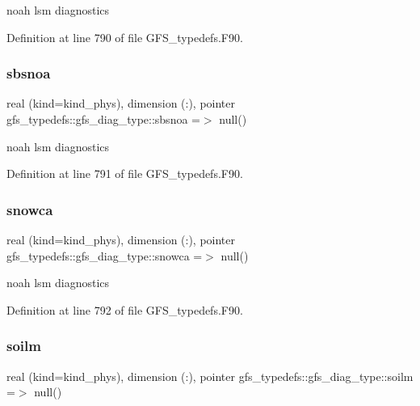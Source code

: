 noah lsm diagnostics 



Definition at line 790 of file G\+F\+S\+\_\+typedefs.\+F90.

\mbox{\label{structgfs__typedefs_1_1gfs__diag__type_acd355bef84752426ef998b18740d1b74}} 
\subsubsection{sbsnoa}
{\footnotesize\ttfamily real (kind=kind\+\_\+phys), dimension (\+:), pointer gfs\+\_\+typedefs\+::gfs\+\_\+diag\+\_\+type\+::sbsnoa =$>$ null()}



noah lsm diagnostics 



Definition at line 791 of file G\+F\+S\+\_\+typedefs.\+F90.

\mbox{\label{structgfs__typedefs_1_1gfs__diag__type_a33f2b7d46ef0551fcfcb0f12c974879d}} 
\subsubsection{snowca}
{\footnotesize\ttfamily real (kind=kind\+\_\+phys), dimension (\+:), pointer gfs\+\_\+typedefs\+::gfs\+\_\+diag\+\_\+type\+::snowca =$>$ null()}



noah lsm diagnostics 



Definition at line 792 of file G\+F\+S\+\_\+typedefs.\+F90.

\mbox{\label{structgfs__typedefs_1_1gfs__diag__type_ae3445ff0f0bbe320105c67e69447a8f7}} 
\subsubsection{soilm}
{\footnotesize\ttfamily real (kind=kind\+\_\+phys), dimension  (\+:), pointer gfs\+\_\+typedefs\+::gfs\+\_\+diag\+\_\+type\+::soilm =$>$ null()}



